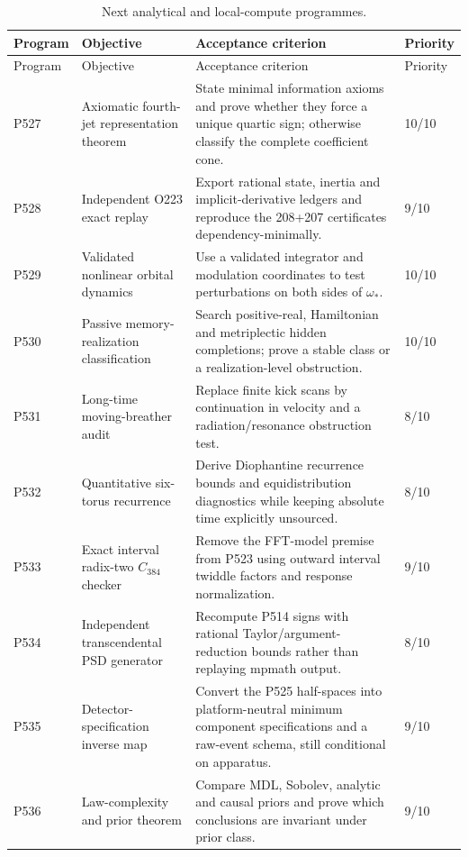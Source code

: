 \documentclass[11pt,a4paper]{article}
\begin{document}
\begin{longtable}{@{}p{}p{}p{}p{}@{}}
\caption{Next analytical and local-compute programmes.}\\
\toprule
Program & Objective & Acceptance criterion & Priority\\
\midrule
\endfirsthead
\toprule
Program & Objective & Acceptance criterion & Priority\\
\midrule
\endhead
P527 & Axiomatic fourth-jet representation theorem & State minimal information axioms and prove whether they force a unique quartic sign; otherwise classify the complete coefficient cone. & 10/10\\
P528 & Independent O223 exact replay & Export rational state, inertia and implicit-derivative ledgers and reproduce the 208+207 certificates dependency-minimally. & 9/10\\
P529 & Validated nonlinear orbital dynamics & Use a validated integrator and modulation coordinates to test perturbations on both sides of $\omega_*$. & 10/10\\
P530 & Passive memory-realization classification & Search positive-real, Hamiltonian and metriplectic hidden completions; prove a stable class or a realization-level obstruction. & 10/10\\
P531 & Long-time moving-breather audit & Replace finite kick scans by continuation in velocity and a radiation/resonance obstruction test. & 8/10\\
P532 & Quantitative six-torus recurrence & Derive Diophantine recurrence bounds and equidistribution diagnostics while keeping absolute time explicitly unsourced. & 8/10\\
P533 & Exact interval radix-two $C_{384}$ checker & Remove the FFT-model premise from P523 using outward interval twiddle factors and response normalization. & 9/10\\
P534 & Independent transcendental PSD generator & Recompute P514 signs with rational Taylor/argument-reduction bounds rather than replaying mpmath output. & 8/10\\
P535 & Detector-specification inverse map & Convert the P525 half-spaces into platform-neutral minimum component specifications and a raw-event schema, still conditional on apparatus. & 9/10\\
P536 & Law-complexity and prior theorem & Compare MDL, Sobolev, analytic and causal priors and prove which conclusions are invariant under prior class. & 9/10\\
\bottomrule
\end{longtable}
\end{document}
